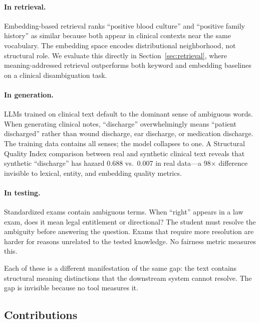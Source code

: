\documentclass[11pt,a4paper]{article}
\begin{document}
\paragraph{In retrieval.} Embedding-based retrieval ranks ``positive blood culture'' and ``positive family history'' as similar because both appear in clinical contexts near the same vocabulary. The embedding space encodes distributional neighborhood, not structural role. We evaluate this directly in Section~\ref{sec:retrieval}, where meaning-addressed retrieval outperforms both keyword and embedding baselines on a clinical disambiguation task.

\paragraph{In generation.} LLMs trained on clinical text default to the dominant sense of ambiguous words. When generating clinical notes, ``discharge'' overwhelmingly means ``patient discharged'' rather than wound discharge, ear discharge, or medication discharge. The training data contains all senses; the model collapses to one. A Structural Quality Index comparison between real and synthetic clinical text reveals that synthetic ``discharge'' has hazard 0.688 vs.\ 0.007 in real data---a 98$\times$ difference invisible to lexical, entity, and embedding quality metrics.

\paragraph{In testing.} Standardized exams contain ambiguous terms. When ``right'' appears in a law exam, does it mean legal entitlement or directional? The student must resolve the ambiguity before answering the question. Exams that require more resolution are harder for reasons unrelated to the tested knowledge. No fairness metric measures this.

Each of these is a different manifestation of the same gap: the text contains structural meaning distinctions that the downstream system cannot resolve. The gap is invisible because no tool measures it.

\subsection{Contributions}
\end{document}
